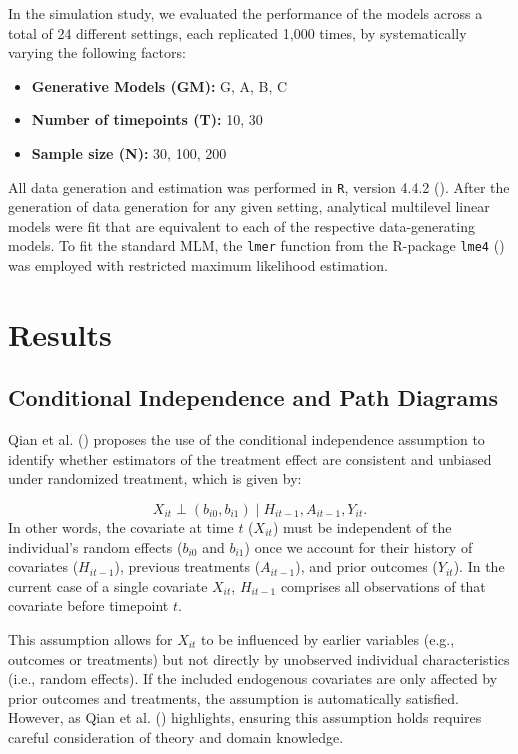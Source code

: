 \documentclass[
  11pt,
  a4paper,
]{article}
\begin{document}
In the simulation study, we evaluated the performance of the models
across a total of 24 different settings, each replicated 1,000 times, by
systematically varying the following factors:

\begin{itemize}
\item
  \textbf{Generative Models (GM):} G, A, B, C
\item
  \textbf{Number of timepoints (T):} 10, 30
\item
  \textbf{Sample size (N):} 30, 100, 200
\end{itemize}

All data generation and estimation was performed in \texttt{R}, version
4.4.2 (). After the generation
of data generation for any given setting, analytical multilevel linear
models were fit that are equivalent to each of the respective
data-generating models. To fit the standard MLM, the \texttt{lmer}
function from the R-package \texttt{lme4}
() was employed with
restricted maximum likelihood estimation.

\section{Results}\label{results}

\subsection{Conditional Independence and Path
Diagrams}\label{conditional-independence-and-path-diagrams}

Qian et al. () proposes the use of the
conditional independence assumption to identify whether estimators of
the treatment effect are consistent and unbiased under randomized
treatment, which is given by:

\[ X_{it} \perp (b_{i0}, b_{i1}) \mid H_{it-1}, A_{it-1}, Y_{it}.\] In
other words, the covariate at time \(t\) (\(X_{it}\)) must be
independent of the individual's random effects (\(b_{i0}\) and
\(b_{i1}\)) once we account for their history of covariates
(\(H_{it-1}\)), previous treatments (\(A_{it-1}\)), and prior outcomes
(\(Y_{it}\)). In the current case of a single covariate \(X_{it}\),
\(H_{it-1}\) comprises all observations of that covariate before
timepoint \(t\).

This assumption allows for \(X_{it}\) to be influenced by earlier
variables (e.g., outcomes or treatments) but not directly by unobserved
individual characteristics (i.e., random effects). If the included
endogenous covariates are only affected by prior outcomes and
treatments, the assumption is automatically satisfied. However, as Qian
et al. () highlights, ensuring this
assumption holds requires careful consideration of theory and domain
knowledge.
\end{document}
